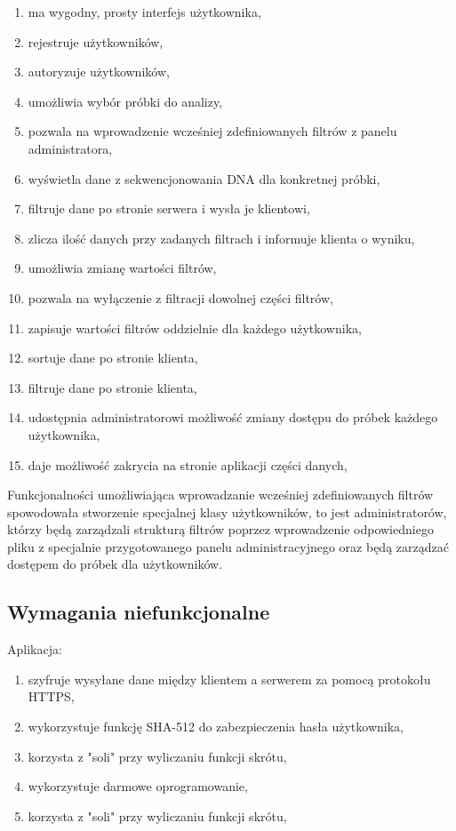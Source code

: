 \documentclass[a4paper,12pt,twoside]{article}
\begin{document}
 \begin{enumerate}[1)]
 \item ma wygodny, prosty interfejs użytkownika,
 \item rejestruje użytkowników,
 \item autoryzuje użytkowników,
 \item umożliwia wybór próbki do analizy,
 \item pozwala na wprowadzenie wcześniej zdefiniowanych filtrów z panelu administratora,
 \item wyświetla dane z sekwencjonowania DNA dla konkretnej próbki,
 \item filtruje dane po stronie serwera i wysła je klientowi,
 \item zlicza ilość danych przy zadanych filtrach i informuje klienta o wyniku,
 \item umożliwia zmianę wartości filtrów,
 \item pozwala na wyłączenie z filtracji dowolnej części filtrów,
 \item zapisuje wartości filtrów oddzielnie dla każdego użytkownika,
 \item sortuje dane po stronie klienta,
 \item filtruje dane po stronie klienta,
 \item udostępnia administratorowi możliwość zmiany dostępu do próbek 
 każdego użytkownika,
 \item daje możliwość zakrycia na stronie aplikacji części danych,	
 \end{enumerate}
 
\newpage

Funkcjonalności umożliwiająca wprowadzanie wcześniej zdefiniowanych filtrów spowodowała stworzenie
specjalnej klasy użytkowników, to jest administratorów, którzy będą zarządzali strukturą filtrów poprzez wprowadzenie odpowiedniego pliku z specjalnie przygotowanego panelu administracyjnego
oraz będą zarządzać dostępem do próbek dla użytkowników.

\subsection{Wymagania niefunkcjonalne}
Aplikacja:
 \begin{enumerate}[1)]
  \item szyfruje wysyłane dane między klientem a serwerem za pomocą protokołu HTTPS,
  \item wykorzystuje funkcję SHA-512 do zabezpieczenia hasła użytkownika,
  \item korzysta z "soli" przy wyliczaniu funkcji skrótu,
  \item wykorzystuje darmowe oprogramowanie,
  \item korzysta z "soli" przy wyliczaniu funkcji skrótu,

 \end{enumerate}
\end{document}
